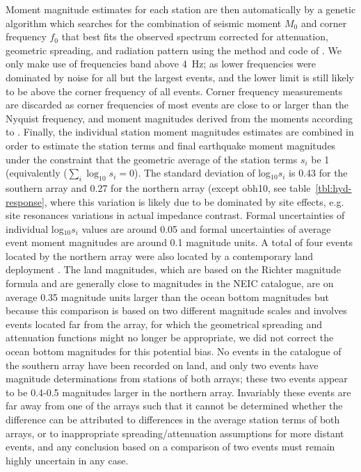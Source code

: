 \documentclass[reviewcopy]{elsarticle}
\begin{document}
Moment magnitude estimates for each station are
 then automatically by a genetic
 algorithm which searches for the combination of seismic moment $M_0$
 and corner frequency $f_0$ that best
 fits the observed spectrum corrected for attenuation, geometric
 spreading, and radiation pattern using the method and code of
 \citet{ottemoeller03}.
We only make use of frequencies
band above 4~Hz; as lower frequencies were dominated by noise for all
but the largest events, and the
lower limit is still likely to be above the corner frequency of all events.
Corner frequency measurements
are discarded as corner frequencies of most events are close to or
larger than the Nyquist frequency, and moment magnitudes derived from
the moments according to \citet{kanamori77}.   Finally, the individual station
moment magnitudes estimates are combined in order to estimate the
station terms and final earthquake moment magnitudes under the
constraint that the geometric average of the station terms $s_i$ be
1 (equivalently ($\sum_i \log_{10}s_i=0$).
The standard deviation of
log$_{10}s_i$ is 0.43 for the southern array and 0.27 for the northern
array (except obh10, see table~\ref{tbl:hyd-response}, where this variation is likely due to be
dominated by site effects, e.g. site resonances variations in actual impedance
contrast. Formal uncertainties of individual log$_{10}s_i$ values are
around 0.05 and formal uncertainties of average event moment
magnitudes are around 0.1 magnitude units.
A total of four events located by the northern array were also located
by a contemporary land deployment \citep{lange07}.
 The land magnitudes, which are based on the Richter magnitude
formula and are generally close to magnitudes in the NEIC catalogue, are on average 0.35 magnitude units larger
than the ocean bottom magnitudes but because this comparison is based
on two different magnitude scales and involves  events located far
from the array, for which the geometrical
spreading and attenuation functions might no longer be appropriate, we
did not correct the ocean bottom magnitudes for this potential bias.
No events in the catalogue of the southern array  have been recorded
on land, and only two events have magnitude determinations from
stations of both arrays; these two events appear to be 0.4-0.5
magnitudes larger in the northern array.  Invariably these events are
far away from one of the arrays such that it cannot be determined whether the
difference can be attributed to differences in the average station
terms of both arrays, or to inappropriate spreading/attenuation
assumptions for more distant events, and any conclusion based on a
comparison of two events must remain highly uncertain in any case.
\end{document}
